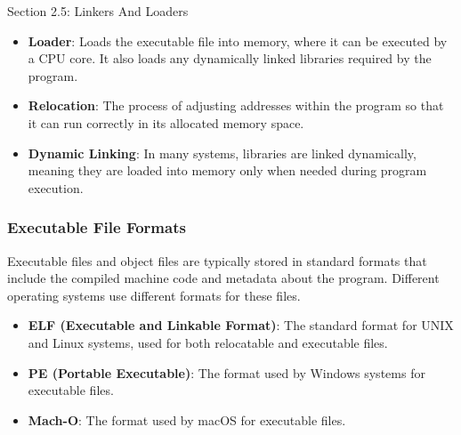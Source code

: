 \begin{notes}{Section 2.5: Linkers And Loaders}
    \begin{highlight}
    
    \begin{itemize}
        \item \textbf{Loader}: Loads the executable file into memory, where it can be executed by a CPU core. It also loads any dynamically linked libraries required by the program.
        \item \textbf{Relocation}: The process of adjusting addresses within the program so that it can run correctly in its allocated memory space.
        \item \textbf{Dynamic Linking}: In many systems, libraries are linked dynamically, meaning they are loaded into memory only when needed during program execution.
    \end{itemize}
    
    \end{highlight}
    
    \subsubsection*{Executable File Formats}
    
    Executable files and object files are typically stored in standard formats that include the compiled machine code and metadata about the program. Different operating systems use different formats for these files.
    
    \begin{highlight}
    
    \begin{itemize}
        \item \textbf{ELF (Executable and Linkable Format)}: The standard format for UNIX and Linux systems, used for both relocatable and executable files.
        \item \textbf{PE (Portable Executable)}: The format used by Windows systems for executable files.
        \item \textbf{Mach-O}: The format used by macOS for executable files.
    \end{itemize}
    
    \end{highlight}
    
    \begin{highlight}
    

\end{highlight}
\end{notes}
